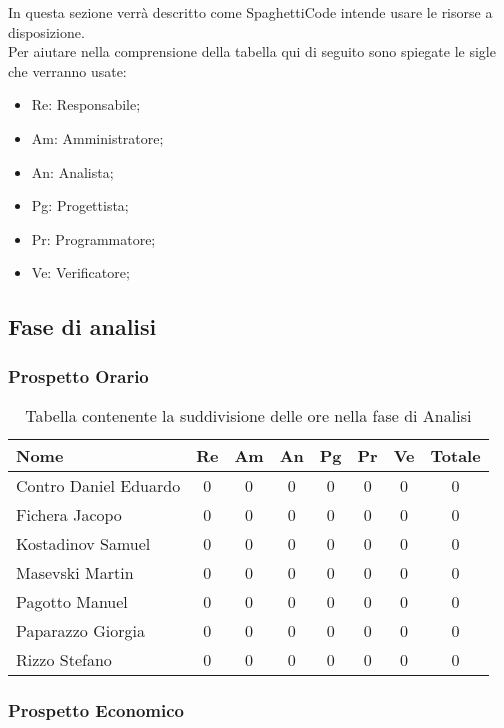 \documentclass[../piano_di_progetto.tex]{subfiles}
\begin{document}
In questa sezione verrà descritto come SpaghettiCode intende usare le risorse a disposizione. \\
Per aiutare nella comprensione della tabella qui di seguito sono spiegate le sigle che verranno usate:
\begin{itemize}
\item Re: Responsabile;
\item Am: Amministratore;
\item An: Analista;
\item Pg: Progettista;
\item Pr: Programmatore;
\item Ve: Verificatore;
\end{itemize}


\subsection{ Fase di analisi}%
\label{sub:fase_analisi}
\subsubsection{Prospetto Orario}


\begin{table}[!ht]

	\centering
	\begin{tabular}{|l|c|c|c|c|c|c|c|}
	\hline
	\rowcolor{lightgray}
	\textbf{Nome} & \textbf{Re} & \textbf{Am} & \textbf{An} & \textbf{Pg}  & \textbf{Pr}   & \textbf{Ve} & \textbf{Totale} \\

	\hline
		Contro Daniel Eduardo & 0 & 0 & 0 & 0 & 0 & 0 & 0 \\
	\hline
		Fichera Jacopo & 0 & 0 & 0 & 0 & 0 & 0 & 0 \\
	\hline
		Kostadinov Samuel & 0 & 0 & 0 & 0 & 0 & 0 & 0 \\			
	\hline
		Masevski Martin & 0 & 0 & 0 & 0 & 0 & 0 & 0 \\
	\hline
		Pagotto Manuel & 0 & 0 & 0 & 0 & 0 & 0 & 0 \\			
	\hline
		Paparazzo Giorgia & 0 & 0 & 0 & 0 & 0 & 0 & 0 \\
	\hline
		Rizzo Stefano & 0 & 0 & 0 & 0 & 0 & 0 & 0 \\
	\hline	
	\end{tabular}
	\caption{Tabella contenente la suddivisione delle ore nella fase di Analisi}
\end{table}


\subsubsection{Prospetto Economico}
\end{document}
